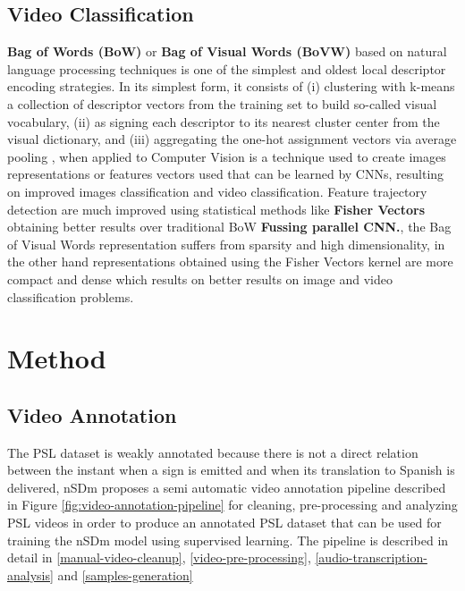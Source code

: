 \documentclass[twocolumn,conference]{article}
\begin{document}
\subsection{Video Classification}
\textbf{Bag of Words (BoW)} or \textbf{Bag of Visual Words (BoVW)} based on natural language processing techniques is one of the simplest and oldest local descriptor encoding strategies. In its simplest form, it consists of (i) clustering with k-means a collection of descriptor vectors from the training set to build so-called visual vocabulary, (ii) as signing each descriptor to its nearest cluster center from the visual dictionary, and (iii) aggregating the one-hot assignment vectors via average pooling \cite{wang2019hallucinating}, when applied to Computer Vision is a technique used to create images representations or features vectors used that can be learned by CNNs, resulting on improved images classification and video classification. 
Feature trajectory detection are much improved using statistical methods like \textbf{Fisher Vectors} obtaining better results over traditional BoW \textbf{Fussing parallel CNN.}, the Bag of Visual Words representation suffers from sparsity and high dimensionality, in the other hand representations obtained using the Fisher Vectors kernel are more compact and dense which results on better results on image and video classification problems.
\section{Method}\label{method}
\subsection{Video Annotation}\label{videoannot}
The PSL dataset is weakly annotated because there is not a direct relation between the instant when a sign is emitted and when its translation to Spanish is delivered, nSDm proposes a semi automatic video annotation pipeline described in Figure \ref{fig:video-annotation-pipeline} for cleaning, pre-processing and analyzing PSL videos in order to produce an annotated PSL dataset that can be used for training the nSDm model using supervised learning. The pipeline is described in detail in \ref{manual-video-cleanup}, \ref{video-pre-processing}, \ref{audio-transcription-analysis} and \ref{samples-generation}
\end{document}
